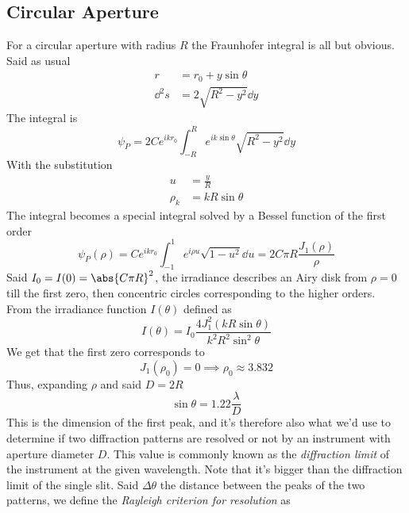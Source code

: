 \documentclass[../electromagnetism.tex]{subfiles}
\begin{document}
\subsection{Circular Aperture}
For a circular aperture with radius $R$ the Fraunhofer integral is all but obvious. Said as usual
\begin{equation*}
	\begin{aligned}
		r&=r_0+y\sin\theta\\
		\dd^2s&=2\sqrt{R^2-y^2}\dd{y}
	\end{aligned}
\end{equation*}
The integral is 
\begin{equation}
	\psi_P=2Ce^{ikr_0}\int_{-R}^{R}e^{ik\sin\theta}\sqrt{R^2-y^2}\dd^{}{y}
	\label{eq:circapint.fradiff}
\end{equation}
With the substitution
\begin{equation*}
	\begin{aligned}
		u&= \frac{y}{R}\\
		\rho_k&= kR\sin\theta
	\end{aligned}
\end{equation*}
The integral becomes a special integral solved by a Bessel function of the first order
\begin{equation*}
	\psi_P(\rho)=Ce^{ikr_0}\int_{-1}^{1}e^{i\rho u}\sqrt{1-u^2}\dd^{}{u}=2C\pi R\frac{J_1(\rho)}{\rho}
\end{equation*}
Said $I_0=I(0)=\abs{C\pi R}^2$, the irradiance describes an Airy disk from $\rho=0$ till the first zero, then concentric circles corresponding to the higher orders.\\
From the irradiance function $I(\theta)$ defined as
\begin{equation}
	I(\theta)=I_0\frac{4J^2_1\left(kR\sin\theta\right)}{k^2R^2\sin^2\theta}
	\label{eq:irradiancecircular.fradiff}
\end{equation}
We get that the first zero corresponds to
\begin{equation*}
	J_1(\rho_0)=0\implies\rho_0\approx3.832
\end{equation*}
Thus, expanding $\rho$ and said $D=2R$
\begin{equation}
	\sin\theta=1.22\frac{\lambda}{D}
	\label{eq:diffractionlimit.fradiff}
\end{equation}
This is the dimension of the first peak, and it's therefore also what we'd use to determine if two diffraction patterns are resolved or not by an instrument with aperture diameter $D$. This value is commonly known as the \textit{diffraction limit} of the instrument at the given wavelength. Note that it's bigger than the diffraction limit of the single slit. Said $\Delta\theta$ the distance between the peaks of the two patterns, we define the \textit{Rayleigh criterion for resolution} as 
\end{document}
